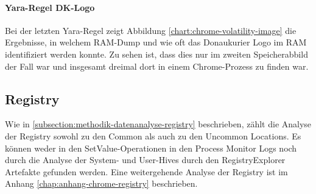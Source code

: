 \begin{table}[h!]
{\begin{tabular}{r}
		\end{tabular}
	}
	\label{chart:chrome-volatility-mail}
\end{table}

\paragraph{Yara-Regel \glqq{}DK-Logo\grqq{}}\label{chap:ergebnisse-chrome-uncommon-volatility-dklogo}

Bei der letzten Yara-Regel zeigt Abbildung \ref{chart:chrome-volatility-image} die Ergebnisse, in welchem RAM-Dump und wie oft das Donaukurier Logo im RAM identifiziert werden konnte. Zu sehen ist, dass dies nur im zweiten Speicherabbild der Fall war und insgesamt dreimal dort in einem Chrome-Prozess zu finden war.

\begin{table}[h!]
	\label{chart:chrome-volatility-image}
\end{table}

\subsection*{Registry}\label{chap:ergebnisse-chrome-uncommon-registry}

Wie in \autoref{subsection:methodik-datenanalyse-registry} beschrieben, zählt die Analyse der Registry sowohl zu den Common als auch zu den Uncommon Locations. Es können weder in den \glqq{}SetValue\grqq{}-Operationen in den Process Monitor Logs noch durch die Analyse der System- und User-Hives durch den RegistryExplorer Artefakte gefunden werden. Eine weitergehende Analyse der Registry ist im Anhang \ref{chap:anhang-chrome-registry} beschrieben.

